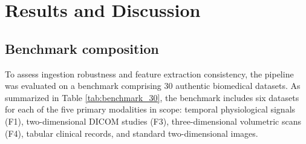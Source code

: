 \section{Results and Discussion}
\label{sec:resultados}

\subsection{Benchmark composition}
To assess ingestion robustness and feature extraction consistency, the pipeline was evaluated on a benchmark comprising 30 authentic biomedical datasets. As summarized in Table \ref{tab:benchmark_30}, the benchmark includes six datasets for each of the five primary modalities in scope: temporal physiological signals (F1), two-dimensional DICOM studies (F3), three-dimensional volumetric scans (F4), tabular clinical records, and standard two-dimensional images.

